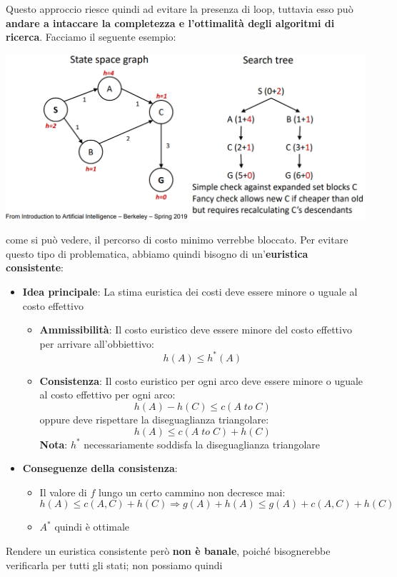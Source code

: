 \documentclass[12pt]{article}
\begin{document}
Questo approccio riesce quindi ad evitare la presenza di loop, tuttavia esso può \textbf{andare a intaccare la completezza e l'ottimalità degli algoritmi di ricerca}.
Facciamo il seguente esempio:
\begin{center}
    \includegraphics[width =0.90\linewidth]{Images/49.PNG}
\end{center}
come si può vedere, il percorso di costo minimo verrebbe bloccato. Per evitare questo tipo di problematica, abbiamo quindi bisogno di un'\textbf{euristica consistente}:
\begin{itemize}
    \item \textbf{Idea principale}: La stima euristica dei costi deve essere minore o uguale al costo effettivo
    \begin{itemize}
        \item \textbf{Ammissibilità}: Il costo euristico deve essere minore del costo effettivo per arrivare all'obbiettivo:
        $$h(A) \leq h^*(A)$$
        \item \textbf{Consistenza}: Il costo euristico per ogni arco deve essere minore o uguale al costo effettivo per ogni arco:
        $$h(A) - h(C) \leq c(A \; to \; C)$$
        oppure deve rispettare la diseguaglianza triangolare:
        $$h(A) \leq c(A \; to \; C) + h(C)$$
        \textbf{Nota}: $h^*$ necessariamente soddisfa la diseguaglianza triangolare
    \end{itemize}
    \item \textbf{Conseguenze della consistenza}:
    \begin{itemize}
        \item Il valore di $f$ lungo un certo cammino non decresce mai:
        $$h(A) \leq c(A, C) + h(C) \Rightarrow g(A) + h(A) \leq g(A) + c(A,C) + h(C)$$
        \item $A^*$ quindi è ottimale
    \end{itemize}
\end{itemize}
Rendere un euristica consistente però \textbf{non è banale}, poiché bisognerebbe verificarla per tutti gli stati; non possiamo quindi
\end{document}
